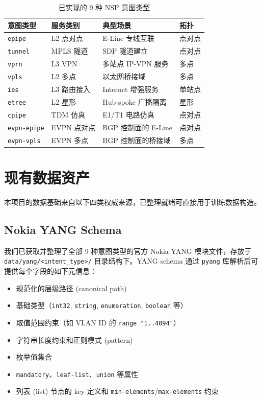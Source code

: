 \documentclass[12pt, a4paper]{article}
\newcommand{\intenttype}[1]{\texttt{#1}}
\newcommand{\filepath}[1]{\texttt{#1}}
\newcommand{\yang}{\textsc{YANG}}
\begin{document}
\begin{table}[H]
\centering
\caption{已实现的 9 种 NSP 意图类型}
\label{tab:intent-types}
\small
\begin{tabular}{llll}
\toprule
\textbf{意图类型} & \textbf{服务类别} & \textbf{典型场景} & \textbf{拓扑} \\
\midrule
\intenttype{epipe}       & L2 点对点     & E-Line 专线互联         & 点对点 \\
\intenttype{tunnel}      & MPLS 隧道     & SDP 隧道建立            & 点对点 \\
\intenttype{vprn}        & L3 VPN        & 多站点 IP-VPN 服务      & 多点 \\
\intenttype{vpls}        & L2 多点       & 以太网桥接域            & 多点 \\
\intenttype{ies}         & L3 路由接入   & Internet 增强服务       & 单站点 \\
\intenttype{etree}       & L2 星形       & Hub-spoke 广播隔离      & 星形 \\
\intenttype{cpipe}       & TDM 仿真      & E1/T1 电路仿真          & 点对点 \\
\intenttype{evpn-epipe}  & EVPN 点对点   & BGP 控制面的 E-Line     & 点对点 \\
\intenttype{evpn-vpls}   & EVPN 多点     & BGP 控制面的桥接域      & 多点 \\
\bottomrule
\end{tabular}
\end{table}

\section{现有数据资产}
\label{sec:data-assets}

本项目的数据基础来自以下四类权威来源，已整理就绪可直接用于训练数据构造。

\subsection{Nokia YANG Schema}

我们已获取并整理了全部 9 种意图类型的官方 Nokia \yang{} 模块文件，存放于 \filepath{data/yang/<intent\_type>/} 目录结构下。\yang{} schema 通过 \texttt{pyang} 库解析后可提供每个字段的如下元信息：

\begin{itemize}
  \item 规范化的层级路径 (canonical path)
  \item 基础类型（\texttt{int32}, \texttt{string}, \texttt{enumeration}, \texttt{boolean} 等）
  \item 取值范围约束（如 VLAN ID 的 \texttt{range "1..4094"}）
  \item 字符串长度约束和正则模式 (pattern)
  \item 枚举值集合
  \item \texttt{mandatory}、\texttt{leaf-list}、\texttt{union} 等属性
  \item 列表 (list) 节点的 key 定义和 \texttt{min-elements}/\texttt{max-elements} 约束
\end{itemize}
\end{document}
